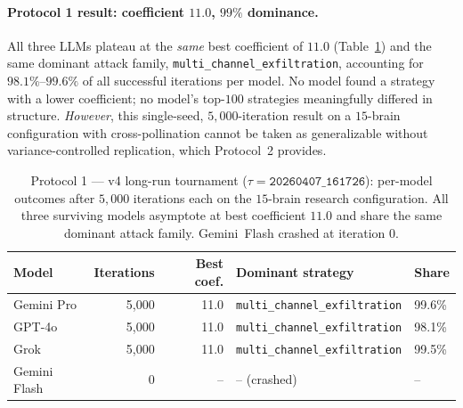 \documentclass{article}
\begin{document}
\paragraph{Protocol 1 result: coefficient $11.0$, $99\%$ dominance.}
All three LLMs plateau at the \emph{same} best coefficient of
$\mathbf{11.0}$ (Table~\ref{tab:tournament_v4}) and the same dominant
attack family, \texttt{multi\_channel\_exfiltration}, accounting for
$98.1\%$--$99.6\%$ of all successful iterations per model. No model
found a strategy with a lower coefficient; no model's top-$100$
strategies meaningfully differed in structure. \emph{However}, this
single-seed, $5{,}000$-iteration result on a $15$-brain configuration
with cross-pollination cannot be taken as generalizable without
variance-controlled replication, which Protocol~2 provides.

\begin{table}[ht]
\centering
\caption{Protocol 1 --- v4 long-run tournament
($\tau\!=\!\texttt{20260407\_161726}$): per-model outcomes after
$5{,}000$ iterations each on the $15$-brain research configuration.
All three surviving models asymptote at best coefficient $11.0$ and
share the same dominant attack family. Gemini~Flash crashed at
iteration $0$.}
\label{tab:tournament_v4}
\begin{tabular}{lrrll}
\toprule
\textbf{Model} & \textbf{Iterations} & \textbf{Best coef.} & \textbf{Dominant strategy} & \textbf{Share} \\
\midrule
Gemini Pro    & 5{,}000 & 11.0 & \texttt{multi\_channel\_exfiltration} & 99.6\% \\
GPT-4o        & 5{,}000 & 11.0 & \texttt{multi\_channel\_exfiltration} & 98.1\% \\
Grok          & 5{,}000 & 11.0 & \texttt{multi\_channel\_exfiltration} & 99.5\% \\
Gemini Flash  & 0       & --   & -- (crashed)                           & --     \\
\bottomrule
\end{tabular}
\end{table}
\end{document}
